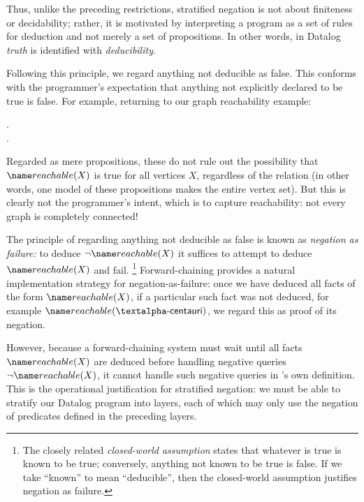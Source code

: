 Thus, unlike the preceding restrictions, stratified negation is not about
finiteness or decidability; rather, it is motivated by interpreting a program
as a set of rules for deduction and not merely a set of propositions. In other
words, in Datalog \emph{truth} is identified with \emph{deducibility}.

Following this principle, we regard anything not deducible as false. This
conforms with the programmer's expectation that anything not explicitly declared
to be true is false. For example, returning to our graph reachability example:

\begin{datalog}
   \gets {} \conj {}.\\
  .
\end{datalog}


\noindent
Regarded as mere propositions, these do not rule out the possibility that
$\atom{reachable}{X}$ is true for all vertices $X$, regardless of the
 relation (in other words, one model of these propositions makes
 the entire vertex set). But this is clearly not the
programmer's intent, which is to capture reachability: not every graph is
completely connected!

The principle of regarding anything not deducible as false is known as
\emph{negation as failure:} to deduce $\neg \atom{reachable}{X}$ it suffices to
attempt to deduce $\atom{reachable}{X}$ and fail.%
\footnote{The closely related \emph{closed-world assumption} states that whatever is true is known to be true; conversely, anything not known to be true is false. If we take ``known'' to mean ``deducible'', then the closed-world assumption justifies negation as failure.}
%
Forward-chaining provides a natural implementation strategy for
negation-as-failure: once we have deduced all facts of the form
$\atom{reachable}{X}$, if a particular such fact was not deduced, for example
$\atom{reachable}{\datum{\textalpha-centauri}}$, we regard this as proof of its
negation.

However, because a forward-chaining system must wait until all facts
$\atom{reachable}{X}$ are deduced before handling negative queries
$\neg\atom{reachable}{X}$, it cannot handle such negative queries in
's own definition.
%
This is the operational justification for stratified negation: we must be able
to stratify our Datalog program into layers, each of which may only use the
negation of predicates defined in the preceding layers.

